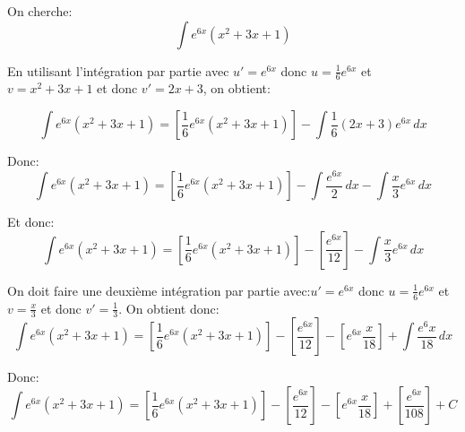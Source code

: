 \documentclass[12pt,a4paper, french]{article}
\begin{document}
 On cherche:
\begin{equation*}
    \int e^{6x}(x^2+3x+1)
\end{equation*}

En utilisant l'intégration par partie avec \begin{math}
    u'=e^{6x}
\end{math} donc \begin{math}
    u=\frac{1}{6}e^{6x}
\end{math} et \begin{math}
    v=x^2+3x+1
\end{math} et donc \begin{math}
    v'=2x+3
\end{math}, on obtient:

\begin{equation*}
    \int e^{6x}(x^2+3x+1)=\left[\frac{1}{6}e^{6x}(x^2+3x+1)\right]-\int \frac{1}{6}(2x+3)e^{6x}\,dx
\end{equation*}
\newpage

Donc: 
\begin{equation*}
    \int e^{6x}(x^2+3x+1)=\left[\frac{1}{6}e^{6x}(x^2+3x+1)\right]-\int \frac{e^{6x}}{2}\,dx-\int \frac{x}{3}e^{6x}\,dx 
\end{equation*}

Et donc:
\begin{equation*}
    \int e^{6x}(x^2+3x+1)=\left[\frac{1}{6}e^{6x}(x^2+3x+1)\right]-\left[\frac{e^{6x}}{12}\right]-\int \frac{x}{3}e^{6x}\,dx
\end{equation*}

On doit faire une deuxième intégration par partie avec:\begin{math}
    u'=e^{6x}
\end{math} donc \begin{math}
    u=\frac{1}{6}e^{6x}
\end{math} et \begin{math}
    v=\frac{x}{3}
\end{math} et donc \begin{math}
    v'=\frac{1}{3}
\end{math}. On obtient donc:
\begin{equation*}
    \int e^{6x}(x^2+3x+1)=\left[\frac{1}{6}e^{6x}(x^2+3x+1)\right]-\left[\frac{e^{6x}}{12}\right]-\left[e^{6x}\frac{x}{18}\right]+\int \frac{e^6x}{18}\,dx
\end{equation*}

Donc:
\begin{equation*}
    \int e^{6x}(x^2+3x+1)=\left[\frac{1}{6}e^{6x}(x^2+3x+1)\right]-\left[\frac{e^{6x}}{12}\right]-\left[e^{6x}\frac{x}{18}\right]+\left[\frac{e^{6x}}{108}\right]+C
\end{equation*}
\end{document}
